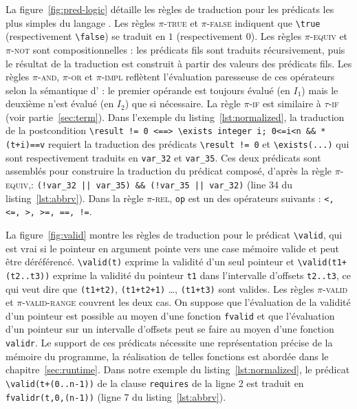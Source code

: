 La figure~\ref{fig:pred-logic} détaille les règles de traduction pour les
prédicats les plus simples du langage \eacsl.
Les règles \textsc{$\pi$-true} et \textsc{$\pi$-false} indiquent que
\lstinline'\true' (respectivement \lstinline'\false') se traduit en $1$
(respectivement $0$).
Les règles \textsc{$\pi$-equiv} et \textsc{$\pi$-not} sont compositionnelles :
les prédicats fils sont traduits récursivement, puis le résultat de la
traduction est construit à partir des valeurs des prédicats fils.
Les règles \textsc{$\pi$-and}, \textsc{$\pi$-or} et \textsc{$\pi$-impl}
reflètent l'évaluation paresseuse de ces opérateurs selon la sémantique d'\eacsl
: le premier opérande est toujours évalué (en $I_1$) mais le deuxième n'est
évalué (en $I_2$) que si nécessaire.
La règle \textsc{$\pi$-if} est similaire à \textsc{$\tau$-if} (voir
partie~\ref{sec:term}).
Dans l'exemple du listing~\ref{lst:normalized}, la traduction de la
postcondition
\lstinline{\result != 0 <==> \exists integer i; 0<=i<n && *(t+i)==v} requiert
la traduction des prédicats \lstinline|\result != 0| et
\lstinline{\exists(...)} qui sont respectivement traduits en \lstinline|var_32|
et \lstinline|var_35|.
Ces deux prédicats sont assemblés pour construire la traduction du prédicat
composé, d'après la règle \textsc{$\pi$-equiv},:
\lstinline{(!var_32 || var_35) && (!var_35 || var_32)} (line 34 du
listing~\ref{lst:abbrv}).
Dans la règle \textsc{$\pi$-rel}, \lstinline|op| est un des opérateurs suivants
: \lstinline[style=c]{<, <=, >, >=, ==, !=}.

La figure~\ref{fig:valid} montre les règles de traduction pour le prédicat
\lstinline|\valid|, qui est vrai si le pointeur en argument pointe vers une
case mémoire valide et peut être déréférencé.
\lstinline'\valid(t)' exprime la validité d'un seul pointeur et
\lstinline'\valid(t1+(t2..t3))' exprime la validité du pointeur \lstinline't1'
dans l'intervalle d'offsets \lstinline't2..t3', ce qui veut dire que
\lstinline'(t1+t2)', \lstinline'(t1+t2+1)' \dots, \lstinline'(t1+t3)' sont
valides.
Les règles \textsc{$\pi$-valid} et \textsc{$\pi$-valid-range} couvrent les deux
cas.
On suppose que l'évaluation de la validité d'un pointeur est possible au moyen
d'une fonction \lstinline'fvalid' et que l'évaluation d'un pointeur sur un
intervalle d'offsets peut se faire au moyen d'une fonction
\lstinline'validr'.
Le support de ces prédicats nécessite une représentation précise de la mémoire
du programme, la réalisation de telles fonctions est abordée dans le
chapitre~\ref{sec:runtime}.
Dans notre exemple du listing~\ref{lst:normalized}, le prédicat
\lstinline|\valid(t+(0..n-1))| de la clause \lstinline|requires| de la ligne 2
est traduit en \lstinline[style=c]|fvalidr(t,0,(n-1))| (ligne 7 du
listing~\ref{lst:abbrv}).

